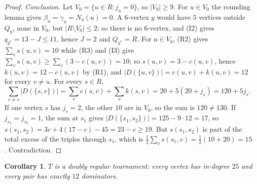 \documentclass[11pt]{amsart}
\newtheorem{corollary}[theorem]{Corollary}
\theoremstyle{definition}
\theoremstyle{remark}
\newcommand{\D}{D}
\newcommand{\abs}[1]{\lvert #1\rvert}
\begin{document}
\begin{proof}
\emph{Conclusion.} Let $V_0=\{u\in R:j_u=0\}$, so $\abs{V_0}\ge9$. For $u\in V_0$ the rounding lemma gives
$\beta_u=\gamma_u=N_4(u)=0$. A $6$-vertex $y$ would have $5$ vertices outside $Q_y$, none in $V_0$, but $\abs{R\setminus V_0}\le2$;
so there is no $6$-vertex, and (I2) gives $q_{y^*}=13-J\le11$, hence $J=2$ and $Q_{y^*}=R$. For $u\in V_0$, (R2) gives
$\sum_vs(u,v)=10$ while (R3) and (I3) give $\sum_vs(u,v)\ge\sum_v(3-c(u,v))=10$; so $s(u,v)=3-c(u,v)$, hence $k(u,v)=12-c(u,v)$
by (R1), and $\abs{\D(\{u,v\})}=c(u,v)+k(u,v)=12$ for every $v\ne u$. For every $s\in R$,
\[
  \sum_{v\ne s}\abs{\D(\{s,v\})}=\sum_vc(s,v)+\sum_vk(s,v)=20+5(20+j_s)=120+5j_s .
\]
If one vertex $s$ has $j_s=2$, the other $10$ are in $V_0$, so the sum is $120\ne130$. If $j_{s_1}=j_{s_2}=1$, the sum at $s_1$ gives
$\abs{\D(\{s_1,s_2\})}=125-9\cdot12=17$, so $s(s_1,s_2)=3c+4(17-c)-45=23-c\ge19$. But $s(s_1,s_2)$ is part of the total excess of
the triples through $s_1$, which is $\frac12\sum_vs(s_1,v)=\frac12(10+20)=15$. Contradiction.
\end{proof}

\begin{corollary}\label{cor:DRT}
$T$ is a doubly regular tournament: every vertex has in-degree $25$ and every pair has exactly $12$ dominators.
\end{corollary}
\end{document}
